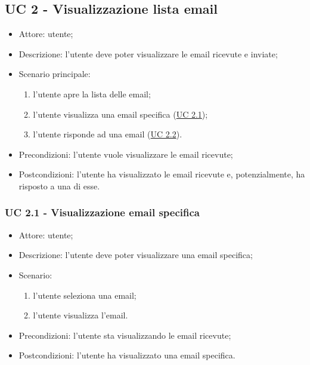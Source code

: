     \subsection{UC 2 - Visualizzazione lista email}  \label{sec: UC 2}
    \begin{itemize}
        \item Attore: utente;
        \item Descrizione: l'utente deve poter visualizzare le email ricevute e inviate;
        \item Scenario principale:
            \begin{enumerate}
            \item l’utente apre la lista delle email;
            \item l'utente visualizza una email specifica (\hyperref[sec: UC 2.1]{UC 2.1});
            \item l’utente risponde ad una email (\hyperref[sec: UC 2.2]{UC 2.2}).
            \end{enumerate}
        \item Precondizioni: l'utente vuole visualizzare le email ricevute;
        \item Postcondizioni: l'utente ha visualizzato le email ricevute e, potenzialmente, ha risposto a una di esse.
    \end{itemize}

    \subsubsection{UC 2.1 - Visualizzazione email specifica} \label{sec: UC 2.1}
    \begin{itemize}
        \item Attore: utente;
        \item Descrizione: l'utente deve poter visualizzare una email specifica;
        \item Scenario:
        \begin{enumerate}
        \item l'utente seleziona una email;
        \item l'utente visualizza l'email.
        \end{enumerate}
        \item Precondizioni: l'utente sta visualizzando le email ricevute;
        \item Postcondizioni: l'utente ha visualizzato una email specifica.
    \end{itemize}

